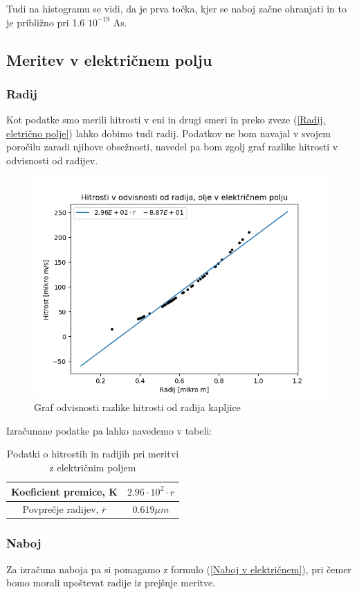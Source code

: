 \documentclass[11pt, a4paper]{article}
\theoremstyle{definition}
\theoremstyle{example}
\theoremstyle{izrek}
\begin{document}
Tudi na histogramu se vidi, da je prva točka, kjer se naboj začne ohranjati in to je približno pri 1.6 $10^{-19}$ As.

\pagebreak
\subsection{Meritev v električnem polju}
\subsubsection{Radij}
Kot podatke smo merili hitrosti v eni in drugi smeri in preko zveze (\ref{Radij, eletrično polje}) lahko dobimo tudi radij. Podatkov ne bom navajal v svojem poročilu zaradi njihove obsežnosti, navedel pa bom zgolj graf razlike hitrosti v odvisnosti od radijev. 
\begin{figure}[H]
	\centering
    \includegraphics[width=12cm]{Elektrika,Radij-hitrost.png}
    \caption{Graf odvisnosti razlike hitrosti od radija kapljice}
\end{figure}
Izračunane podatke pa lahko navedemo v tabeli: 
\begin{table}[h]
	\centering
	\begin{tabular}{|c|c|}
	\hline
	\hline
	Koeficient premice, K & $2.96 \cdot 10^{2} \cdot r $\\
	\hline
	Povprečje radijev, $\overline{r}$ & $0.619 \mu m$ \\
	\hline
	\end{tabular}
	\caption{Podatki o hitrostih in radijih pri meritvi z električnim poljem}
\end{table}

\subsubsection{Naboj}
Za izračuna naboja pa si pomagamo z formulo (\ref{Naboj v električnem}), pri čemer bomo morali upoštevat radije iz prejšnje meritve. 
\end{document}
